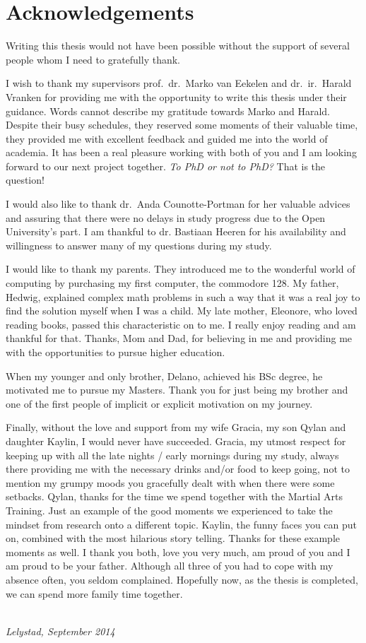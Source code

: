\chapter*{Acknowledgements}


Writing this thesis would not have been possible without the support of several people whom I need to gratefully thank.

I wish to thank my supervisors prof.\ dr.\ Marko van Eekelen and dr.\ ir.\ Harald Vranken for providing me with the opportunity to write this thesis under their guidance.
Words cannot describe my gratitude towards Marko and Harald. Despite their busy schedules, they reserved some moments of their valuable time, they provided me with excellent feedback and guided me into the world of academia.
It has been a real pleasure working with both of you and I am looking forward to our next project together.
\emph{To PhD or not to PhD?} That is the question!

I would also like to thank dr.\ Anda Counotte-Portman for her valuable advices and assuring that there were no delays in study progress due to the Open University's part.
I am thankful to dr. Bastiaan Heeren for his availability and willingness to answer many of my questions during my study.

I would like to thank my parents. They introduced me to the wonderful world of computing by purchasing my first computer, the commodore 128.
My father, Hedwig, explained complex math problems in such a way that it was a real joy to find the solution myself when I was a child.
My late mother, Eleonore, who loved reading books, passed this characteristic on to me. I really enjoy reading and am thankful for that.
Thanks, Mom and Dad, for believing in me and providing me with the opportunities to pursue higher education.

When my younger and only brother, Delano, achieved his BSc degree, he motivated me to pursue my Masters.
Thank you for just being my brother and one of the first people of implicit or explicit motivation on my journey.

Finally, without the love and support from my wife Gracia, my son Qylan and daughter Kaylin, I would never have succeeded.
Gracia, my utmost respect for keeping up with all the late nights / early mornings during my study, always there providing me with the necessary drinks and/or food to keep going, not to mention my grumpy moods you gracefully dealt with when there were some setbacks.
Qylan, thanks for the time we spend together with the Martial Arts Training. Just an example of the good moments we experienced to take the mindset from research onto a different topic.
Kaylin, the funny faces you can put on, combined with the most hilarious story telling. Thanks for these example moments as well.
I thank you both, love you very much, am proud of you and I am proud to be your father.
Although all three of you had to cope with my absence often, you seldom complained.
Hopefully now, as the thesis is completed, we can spend more family time together.


\begin{flushright}
{\makeatletter\itshape
    \@author \\
    Lelystad, September 2014
\makeatother}
\end{flushright}


